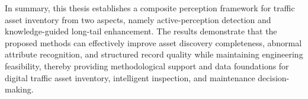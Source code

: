 In summary, this thesis establishes a composite perception framework for traffic asset inventory from two aspects, namely active-perception detection and knowledge-guided long-tail enhancement. The results demonstrate that the proposed methods can effectively improve asset discovery completeness, abnormal attribute recognition, and structured record quality while maintaining engineering feasibility, thereby providing methodological support and data foundations for digital traffic asset inventory, intelligent inspection, and maintenance decision-making.
